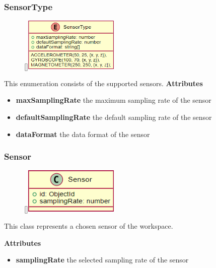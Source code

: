 \subsubsection{SensorType}
\label{SensorType}
\begin{figure}
    \raisebox{0pt}[\dimexpr{}\baselineskip\relax]{\includegraphics[width=4.5cm]{classes/workspace-management/4.png}}
\end{figure} 
\par
This enumeration consists of the supported sensors.
\newline
\newline
\textbf{Attributes}
\begin{itemize}
    \item \textbf{maxSamplingRate} the maximum sampling rate of the sensor
    \item \textbf{defaultSamplingRate} the default sampling rate of the sensor
    \item \textbf{dataFormat} the data format of the sensor
\end{itemize}

\subsubsection{Sensor}
\label{Sensor}
\begin{figure}
    \raisebox{0pt}[\dimexpr{}\baselineskip\relax]{\includegraphics[width=4.5cm]{classes/workspace-management/3.png}}
\end{figure} 
\par
This class represents a chosen sensor of the workspace. 
\newline
\newline

\textbf{Attributes}
\begin{itemize}
    \item \textbf{samplingRate} the selected sampling rate of the sensor
\end{itemize}

